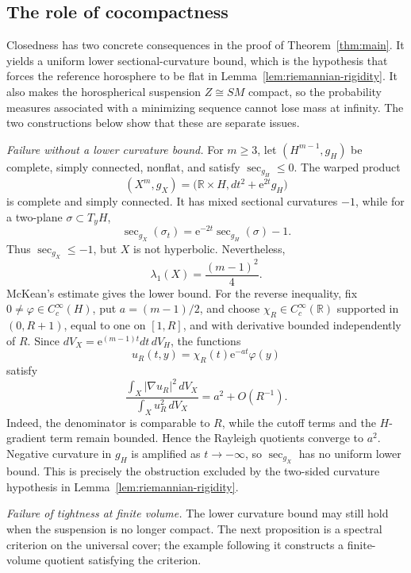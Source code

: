 \documentclass[12pt]{amsart}
\theoremstyle{definition}
\numberwithin{equation}{section}
\newcommand{\ee}{{\mathrm{e}}}
\newcommand{\R}{\mathbb{R}}
\begin{document}
\subsection{The role of cocompactness}
\label{subsec:role-cocompactness}

Closedness has two concrete consequences in the proof of
Theorem~\ref{thm:main}.  It yields a uniform lower sectional-curvature
bound, which is the hypothesis that forces the reference horosphere to be
flat in Lemma~\ref{lem:riemannian-rigidity}.  It also makes the horospherical
suspension \(Z\cong SM\) compact, so the probability measures associated
with a minimizing sequence cannot lose mass at infinity.  The two
constructions below show that these are separate issues.

\medskip
\noindent\emph{Failure without a lower curvature bound.}
For \(m\geq3\), let \((H^{m-1},g_H)\) be complete, simply connected,
nonflat, and satisfy \(\sec_{g_H}\leq0\).  The warped product
\[
  (X^m,g_X)
  =\bigl(\R\times H,dt^2+\ee^{2t}g_H\bigr)
\]
is complete and simply connected.  It has mixed sectional curvatures
\(-1\), while for a two-plane
\(\sigma\subset T_yH\),
\[
  \sec_{g_X}(\sigma_t)
  =\ee^{-2t}\sec_{g_H}(\sigma)-1.
\]
Thus \(\sec_{g_X}\leq-1\), but \(X\) is not hyperbolic.  Nevertheless,
\[
  \lambda_1(X)=\frac{(m-1)^2}{4}.
\]
McKean's estimate gives the lower bound.  For the reverse inequality, fix
\(0\neq\varphi\in C_c^\infty(H)\), put \(a=(m-1)/2\), and choose
\(\chi_R\in C_c^\infty(\mathbb R)\) supported in \((0,R+1)\), equal to one
on \([1,R]\), and with derivative bounded independently of \(R\).  Since
\(dV_X=\ee^{(m-1)t}dt\,dV_H\), the functions
\[
  u_R(t,y)=\chi_R(t)\ee^{-at}\varphi(y)
\]
satisfy
\[
  \frac{\int_X|\nabla u_R|^2\,dV_X}
       {\int_Xu_R^2\,dV_X}
  =a^2+O(R^{-1}).
\]
Indeed, the denominator is comparable to \(R\), while the cutoff terms
and the \(H\)-gradient term remain bounded.  Hence the Rayleigh quotients
converge to \(a^2\).  Negative curvature in \(g_H\) is amplified as
\(t\to-\infty\), so \(\sec_{g_X}\) has no uniform lower bound.  This is
precisely the obstruction excluded by the two-sided curvature hypothesis
in Lemma~\ref{lem:riemannian-rigidity}.

\medskip
\noindent\emph{Failure of tightness at finite volume.}
The lower curvature bound may still hold when the suspension is no longer
compact.  The next proposition is a spectral criterion on the
universal cover; the example following it constructs a finite-volume
quotient satisfying the criterion.
\end{document}
